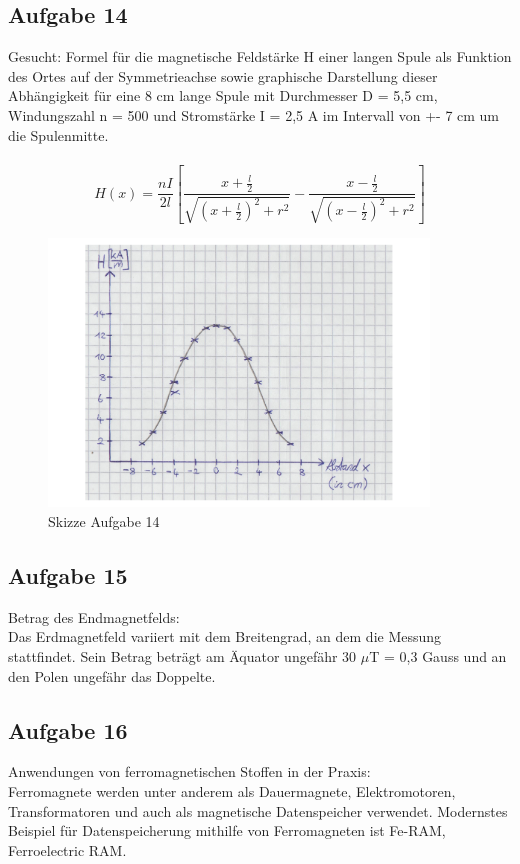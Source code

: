 \documentclass[a4paper,10pt]{scrartcl}
\begin{document}
\subsection{Aufgabe 14}
Gesucht: Formel für die magnetische Feldstärke H einer langen Spule als Funktion des Ortes auf der Symmetrieachse sowie graphische Darstellung dieser Abhängigkeit für eine 8 cm lange Spule mit Durchmesser D = 5,5 cm,  Windungszahl n = 500 und Stromstärke I = 2,5 A im Intervall von +- 7 cm um die Spulenmitte. \\ \\
\begin{equation}
	H(x) = \frac{nI}{2l} [\frac{x+\frac{l}{2}}{\sqrt{(x+\frac{l}{2})^2+r^2}}-\frac{x-\frac{l}{2}}{\sqrt{(x-\frac{l}{2})^2+r^2}}]
\end{equation}
\begin{figure}[h]
\centering
\includegraphics[width=0.9\textwidth]{./Bilder/fma14}
\caption{Skizze Aufgabe 14}
\end{figure}
\FloatBarrier
\subsection{Aufgabe 15}
Betrag des Endmagnetfelds: \\
Das Erdmagnetfeld variiert mit dem Breitengrad, an dem die Messung stattfindet. Sein Betrag beträgt am Äquator ungefähr 30 $\mu$T = 0,3 Gauss und an den Polen ungefähr das Doppelte.
\subsection{Aufgabe 16}
Anwendungen von ferromagnetischen Stoffen in der Praxis: \\
Ferromagnete werden unter anderem als Dauermagnete, Elektromotoren, Transformatoren und auch als magnetische Datenspeicher verwendet. Modernstes Beispiel für Datenspeicherung mithilfe von Ferromagneten ist Fe-RAM, Ferroelectric RAM.

	
\end{document}
